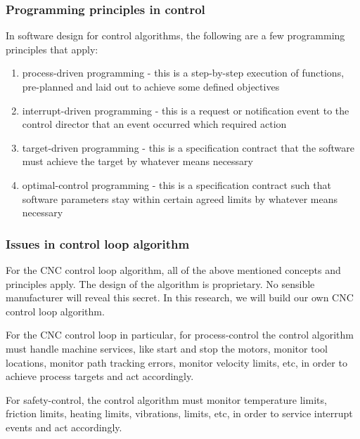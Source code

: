 \subsubsection{Programming principles in control}

In software design for control algorithms, the following are a few programming principles that apply:
\begin{enumerate}
	\item process-driven programming - this is a step-by-step execution of functions, pre-planned and laid out to achieve some defined objectives 
	
	\item interrupt-driven programming - this is a request or notification event to the control director that an event occurred which required action 
	
	\item target-driven programming - this is a specification contract that the software must achieve the target by whatever means necessary
	
	\item optimal-control programming - this is a specification contract such that software parameters stay within certain agreed limits by whatever means necessary
	
\end{enumerate}

\subsubsection{Issues in control loop algorithm}

For the CNC control loop algorithm, all of the above mentioned concepts and principles apply. The design of the algorithm is proprietary. No sensible manufacturer will reveal this secret. In this research, we will build our own CNC control loop algorithm.
\vspace*{1\baselineskip}

For the CNC control loop in particular, for process-control the control algorithm must handle machine services, like start and stop the motors, monitor tool locations, monitor path tracking errors, monitor velocity limits, etc, in order to achieve process targets and act accordingly.
\vspace*{1\baselineskip}

For safety-control, the control algorithm must monitor temperature limits, friction limits, heating limits, vibrations, limits, etc, in order to service interrupt events and act accordingly.   
\vspace*{1\baselineskip}

